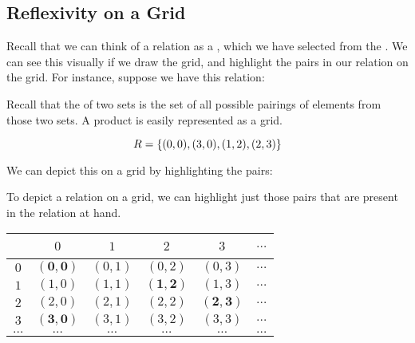 \documentclass[../../../main.tex]{subfiles}
\begin{document}
\subsection{Reflexivity on a Grid}

Recall that we can think of a relation as a , which we have selected from the . We can see this visually if we draw the grid, and highlight the pairs in our relation on the grid. For instance, suppose we have this relation:

\begin{aside}
  \begin{remark}
    Recall that the  of two sets is the set of all possible pairings of elements from those two sets. A product is easily represented as a grid.
  \end{remark}
\end{aside}

\begin{equation*}
  R = \{ (0,0), (3, 0), (1, 2), (2, 3) \}
\end{equation*}

We can depict this on a grid by highlighting the pairs:

\begin{aside}
  \begin{remark}
    To depict a relation on a grid, we can highlight just those pairs that are present in the relation at hand.
  \end{remark}
\end{aside}

\begin{center}
  \begin{tabular}{| c | c | c | c | c | c |}
    \hline
    ~   & $0$      & $1$      & $2$      & $3$      & $\ldots$ \\ \hline
    $0$ & \textcolor{vocabcolor}{$\mathbf{(0, 0)}$} & $(0, 1)$ & $(0, 2)$ & $(0, 3)$ & $\ldots$ \\ \hline
    $1$ & $(1, 0)$ & $(1, 1)$ & \textcolor{vocabcolor}{$\mathbf{(1, 2)}$} & $(1, 3)$ & $\ldots$ \\ \hline
    $2$ & $(2, 0)$ & $(2, 1)$ & $(2, 2)$ & \textcolor{vocabcolor}{$\mathbf{(2, 3)}$} & $\ldots$ \\ \hline
    $3$ & \textcolor{vocabcolor}{$\mathbf{(3, 0)}$} & $(3, 1)$ & $(3, 2)$ & $(3, 3)$ & $\ldots$ \\ \hline
    $\ldots$ & $\ldots$ & $\ldots$ & $\ldots$ & $\ldots$ & $\ldots$ \\ \hline                
  \end{tabular}
\end{center}
\end{document}
